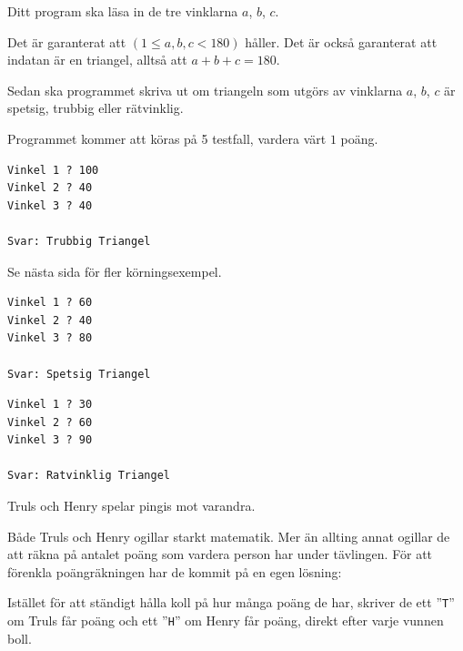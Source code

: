 Ditt program ska läsa in de tre vinklarna $a$, $b$, $c$.

Det är garanterat att $(1 \leq a, b, c < 180)$ håller. Det är också garanterat att indatan är en triangel, alltså att $a + b + c = 180$.

Sedan ska programmet skriva ut om triangeln som utgörs av vinklarna $a$, $b$, $c$ är spetsig, trubbig eller rätvinklig. 

 Programmet kommer att köras på 5 testfall, vardera värt $1$ poäng.

\vspace{1cm}
\begin{verbatim}
Vinkel 1 ? 100
Vinkel 2 ? 40
Vinkel 3 ? 40

Svar: Trubbig Triangel
\end{verbatim}
Se nästa sida för fler körningsexempel.

\newpage

\begin{verbatim}
Vinkel 1 ? 60
Vinkel 2 ? 40
Vinkel 3 ? 80

Svar: Spetsig Triangel
\end{verbatim}

\begin{verbatim}
Vinkel 1 ? 30
Vinkel 2 ? 60
Vinkel 3 ? 90

Svar: Ratvinklig Triangel
\end{verbatim}


\newpage
{}



Truls och Henry spelar pingis mot varandra.

Både Truls och Henry ogillar starkt matematik.
Mer än allting annat ogillar de att räkna på antalet poäng som vardera person har under tävlingen.
För att förenkla poängräkningen har de kommit på en egen lösning:

Istället för att ständigt hålla koll på hur många poäng de har, skriver de 
ett ”\texttt{T}” om Truls får poäng och ett ”\texttt{H}” om Henry
får poäng, direkt efter varje vunnen boll.

